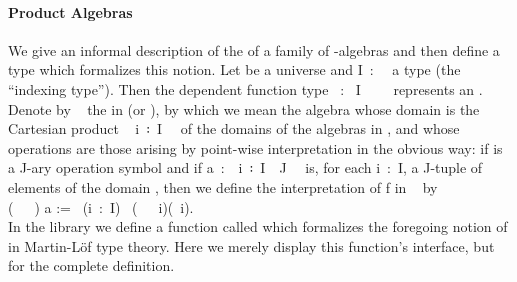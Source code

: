 \paragraph*{Product Algebras}
We give an informal description of the  of a family of -algebras and
then define a type which formalizes this notion.
Let  be a universe and \ab I~:~~ a type (the ``indexing type'').
Then the dependent function type ~:~\ab
I~~~~ represents an .
Denote by ~ the  in  (or ), by which we mean the algebra whose domain is the Cartesian product ~\ab
i~꞉~\ab I~\af{,}~ of the domains of the algebras in , and
whose operations are those arising by point-wise interpretation in the obvious way: if
 is a \ab J-ary operation symbol and if
\ab a~:~~\ab i~꞉~\ab I~\af{,}~\ab J~~ is, for each
\ab i~:~\ab I, a \ab J-tuple of elements of the domain , then
we define the interpretation of \ab f in ~ by\\[-2mm]

(~~~) \ab a := ~(\ab i~:~\ab I)~
(~~~\ab i)(~\ab i).\\[8pt]
In the \agdaalgebras library we define a function called  which formalizes the
foregoing notion of  in Martin-Löf type theory.
\ifshort
Here we merely display this function's interface, but \seeshort for the complete definition.


